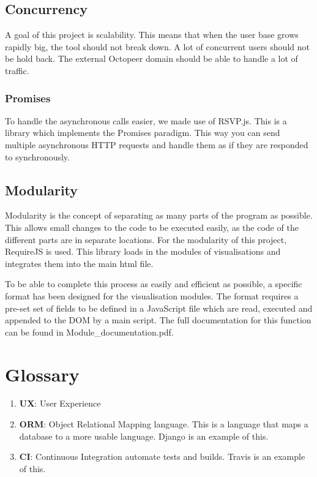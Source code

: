 \documentclass{article}
\begin{document}
\subsection{Concurrency}

A goal of this project is scalability. This means that when the user base grows rapidly big, the tool should not break down. A lot of concurrent users should not be hold back. The external Octopeer domain should be able to handle a lot of traffic.

\subsubsection{Promises}

To handle the asynchronous calls easier, we made use of RSVP.js. This is a library which implements the Promises paradigm. This way you can send multiple asynchronous HTTP requests and handle them as if they are responded to synchronously.

\subsection{Modularity}

Modularity is the concept of separating as many parts of the program as possible. This allows small changes to the code to be executed easily, as the code of the different parts are in separate locations. For the modularity of this project, RequireJS is used. This library loads in the modules of visualisations and integrates them into the main html file.

To be able to complete this process as easily and efficient as possible, a specific format has been designed for the visualisation modules. The format requires a pre-set set of fields to be defined in a JavaScript file which are read, executed and appended to the DOM by a main script. The full documentation for this function can be found in Module\_documentation.pdf.

\section{Glossary}

\begin{enumerate}
    \item \textbf{UX}: User Experience
    \item \textbf{ORM}: Object Relational Mapping language. This is a language that maps a database to a more usable language. Django is an example of this.
    \item \textbf{CI}: Continuous Integration automate tests and builds. Travis is an example of this.
\end{enumerate}
\end{document}
